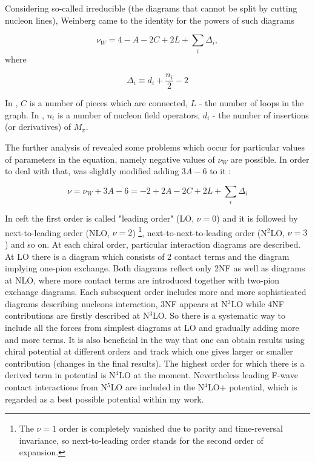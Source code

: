 Considering so-called irreducible (the diagrams that cannot be split
by cutting nucleon lines), Weinberg \cite{WEINBERG1990,WEINBERG1991}
came to the identity for the powers of such diagrams

\begin{equation}
    \nu_W = 4 - A - 2C + 2L + \sum_i \Delta_i,
    \label{powers}
\end{equation}
where

\begin{equation}
    \Delta_i \equiv d_i + \frac{n_i}{2} - 2
    \label{Delta}
\end{equation}

In , $C$ is a number of pieces which are connected, $L$ - the number of loops in the graph.
In , $n_i$ is a number of nucleon field operators, $d_i$ - the number of insertions
(or derivatives) of  $M_\pi$.

The further analysis of  revealed some problems which occur 
for particular values of parameters in the equation, namely negative values of $\nu_W$ 
are possible.
In order to deal with that,  
was slightly modified adding $3A - 6$ to it  \cite{Machleidt2011, EPELBAUM2006_PROGRESS}:

\begin{equation}
    \nu = \nu_W + 3A  - 6 = -2 + 2A - 2C + 2L + \sum_i \Delta_i
    \label{powers_corrected}
\end{equation}


In \gls{ceft} the first order is called "leading order" (LO, $\nu=0$)  and it is followed 
by next-to-leading order (NLO, $\nu=2$)
\footnote{The $\nu=1$ order is completely vanished due to parity and time-reversal invariance,
so next-to-leading order stands for the second order of expansion.},
 next-to-next-to-leading order (N$^2$LO, $\nu=3$) and so on.
 At each chiral order, particular interaction diagrams are described.
 At LO there is a diagram which consists of 2 contact terms and the diagram
 implying one-pion exchange. Both diagrams reflect only 2NF as well
 as diagrams at NLO, where more contact terms are introduced together with two-pion 
 exchange diagrams. Each subsequent order includes more and more sophisticated diagrams
 describing nucleons interaction,
 3NF appears at N$^2$LO while 4NF contributions are firstly described at N$^3$LO.
 So there is a systematic
way to include all the forces from simplest diagrams at LO and gradually
adding more and more terms. 
It is also beneficial in the way that 
one can obtain results using chiral potential at different
orders and track which one gives larger or smaller contribution (changes in the
final results).
The highest order for which there is a derived term in potential
is N$^4$LO at the moment. Nevertheless leading F-wave contact interactions from N$^5$LO are included in the N$^4$LO+ potential,
which is regarded as a best possible potential within my work. 

